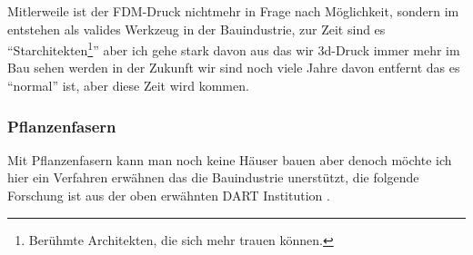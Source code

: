 \documentclass{article}
\begin{document}
Mitlerweile ist der FDM-Druck nichtmehr in Frage nach M\"oglichkeit, sondern im entstehen als valides
Werkzeug in der Bauindustrie, zur Zeit sind es
``Starchitekten\footnote{Ber\"uhmte Architekten, die sich mehr trauen k\"onnen.}'' aber ich gehe stark 
davon aus das wir 3d-Druck immer mehr im Bau sehen werden in der Zukunft wir sind noch viele Jahre davon 
entfernt das es ``normal'' ist, aber diese Zeit wird kommen.

\subsubsection{Pflanzenfasern}
Mit Pflanzenfasern kann man noch keine H\"auser bauen aber denoch m\"ochte ich hier ein Verfahren erw\"ahnen
das die Bauindustrie unerst\"utzt, die folgende Forschung ist aus der oben erw\"ahnten DART Institution \parencite{kahn2023}.
\end{document}
